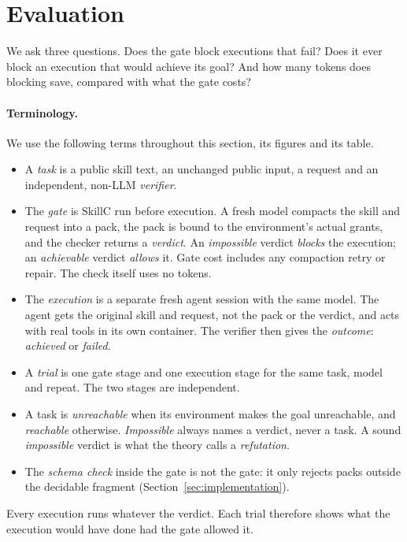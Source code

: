 \section{Evaluation}\label{sec:evaluation}

We ask three questions. Does the gate block executions that fail? Does it
ever block an execution that would achieve its goal? And how many tokens does
blocking save, compared with what the gate costs?

\paragraph{Terminology.}
We use the following terms throughout this section, its figures and its table.
\begin{itemize}\setlength{\itemsep}{1pt}
\item A \emph{task} is a public skill text, an unchanged public input, a
  request and an independent, non-LLM \emph{verifier}.
\item The \emph{gate} is SkillC run before execution. A fresh model compacts
  the skill and request into a pack, the pack is bound to the environment's
  actual grants, and the checker returns a \emph{verdict}. An
  \emph{impossible} verdict \emph{blocks} the execution; an \emph{achievable}
  verdict \emph{allows} it. Gate cost includes any compaction retry or repair.
  The check itself uses no tokens.
\item The \emph{execution} is a separate fresh agent session with the same
  model. The agent gets the original skill and request, not the pack or the
  verdict, and acts with real tools in its own container. The verifier then
  gives the \emph{outcome}: \emph{achieved} or \emph{failed}.
\item A \emph{trial} is one gate stage and one execution stage for the same
  task, model and repeat. The two stages are independent.
\item A task is \emph{unreachable} when its environment makes the goal
  unreachable, and \emph{reachable} otherwise. \emph{Impossible} always
  names a verdict, never a task. A sound \emph{impossible} verdict is what the
  theory calls a \emph{refutation}.
\item The \emph{schema check} inside the gate is not the gate: it only
  rejects packs outside the decidable fragment (Section~\ref{sec:implementation}).
\end{itemize}
Every execution runs whatever the verdict. Each trial therefore shows what
the execution would have done had the gate allowed it.

